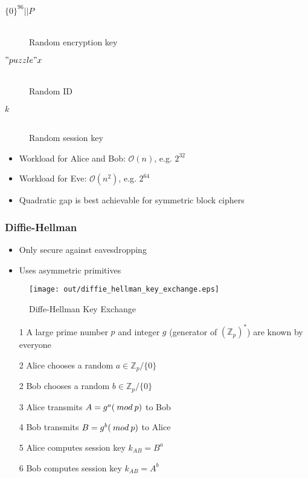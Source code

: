 \documentclass[a4paper]{article}
\begin{document}

\begin{description}
  \item[$\{0\}^{96} || P$] \hfill \\
    Random encryption key
  \item[$"puzzle" x$] \hfill \\
    Random ID
  \item[$k$] \hfill \\
    Random session key
\end{description}


\begin{itemize}
  \item Workload for Alice and Bob: $\mathcal{O}(n)$, e.g. $2^{32}$
  \item Workload for Eve: $\mathcal{O}(n^{2})$, e.g. $2^{64}$
  \item Quadratic gap is best achievable for symmetric block ciphers
\end{itemize}

\subsubsection{Diffie-Hellman}

\begin{itemize}
  \item Only secure against eavesdropping
  \item Uses asymmetric primitives
\end{itemize}

\begin{figure}[h!]
  \centering
  \texttt{[image: out/diffie\_hellman\_key\_exchange.eps]}
  \caption{Diffe-Hellman Key Exchange}
  \label{fig:diffe_hellman_key_exchange}
\end{figure}
\FloatBarrier


\begin{enumerate}
  \item[1] A large prime number $p$ and integer $g$ (generator of
           $(\mathbb{Z}_{p})^{*}$) are known by everyone
  \item[2] Alice chooses a random $a \in \mathbb{Z}_{p} / \{0\}$
  \item[2] Bob chooses a random $b \in \mathbb{Z}_{p} / \{0\}$
  \item[3] Alice transmits $A = g^{a} (\: mod \: p)$ to Bob
  \item[4] Bob transmits $B = g^{b} (\: mod \: p)$ to Alice
  \item[5] Alice computes session key $k_{AB} = B^{a}$
  \item[6] Bob computes session key $k_{AB} = A^{b}$
\end{enumerate}
\end{document}
